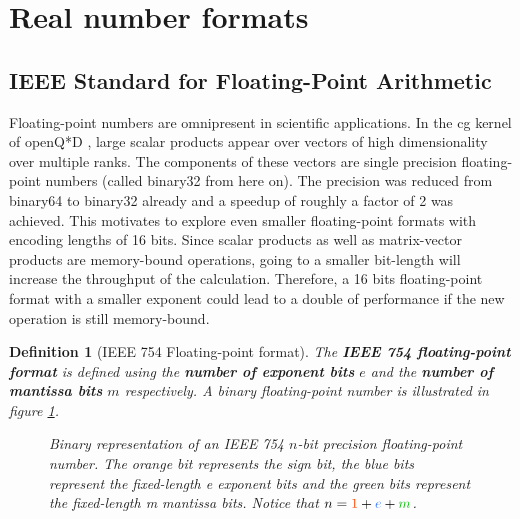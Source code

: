 \documentclass{article}
\theoremstyle{plain} %
\newtheorem{definition}{Definition}[section]
\theoremstyle{convention} %
\theoremstyle{remark} %
\def\df#1{\textbf{\textit{#1}}}
\numberwithin{equation}{section}
\begin{document}
\section{Real number formats}

\label{sec:floats}

\subsection{IEEE Standard for Floating-Point Arithmetic}

Floating-point numbers are omnipresent in scientific applications. In the \acrfull{cg} kernel of openQ*D \cite{openqxd}, large scalar products appear over vectors of high dimensionality over multiple ranks. The components of these vectors are single precision floating-point numbers (called \gls{binary32} from here on). The precision was reduced from \gls{binary64} to \gls{binary32} already and a speedup of roughly a factor of 2 was achieved. This motivates to explore even smaller floating-point formats with encoding lengths of 16 bits. Since scalar products as well as matrix-vector products are memory-bound operations, going to a smaller bit-length will increase the throughput of the calculation. Therefore, a 16 bits floating-point format with a smaller exponent could lead to a double of performance if the new operation is still memory-bound.

\begin{definition}[IEEE 754 Floating-point format]

The \df{IEEE 754 floating-point format} \cite{ieee754_1985} is defined using the \df{number of exponent bits} $e$ and the \df{number of mantissa bits} $m$ respectively. A binary floating-point number is illustrated in figure \ref{fig:float}.

\begin{figure}[H]
  \caption{Binary representation of an IEEE 754 $n$-bit precision floating-point number. The \textcolor{corange}{orange} bit represents the \textcolor{corange}{sign bit}, the \textcolor{cblue}{blue} bits represent the fixed-length \textcolor{cblue}{e exponent bits} and the \textcolor{cgreen}{green} bits represent the fixed-length \textcolor{cgreen}{m mantissa bits}. Notice that $n = \textcolor{corange}{1} + \textcolor{cblue}{e} + \textcolor{cgreen}{m}$.}
  \label{fig:float}
\end{figure}

\end{definition}
\end{document}
